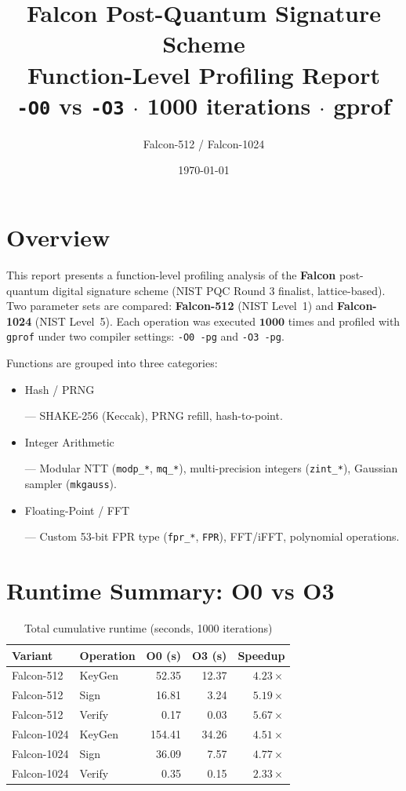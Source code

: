 \documentclass[11pt,a4paper]{article}
\title{\textbf{Falcon Post-Quantum Signature Scheme}\\
        \large Function-Level Profiling Report\\
        \normalsize \texttt{-O0} vs \texttt{-O3} $\cdot$ 1000 iterations $\cdot$ gprof}
\author{Falcon-512 / Falcon-1024}
\date{\today}
\begin{document}
\maketitle
\tableofcontents
\newpage

\section{Overview}

This report presents a function-level profiling analysis of the
\textbf{Falcon} post-quantum digital signature scheme
(NIST PQC Round 3 finalist, lattice-based).
Two parameter sets are compared: \textbf{Falcon-512} (NIST Level~1)
and \textbf{Falcon-1024} (NIST Level~5).
Each operation was executed $\mathbf{1000}$ times and profiled with
\texttt{gprof} under two compiler settings:
\texttt{-O0 -pg} and \texttt{-O3 -pg}.

Functions are grouped into three categories:
\begin{itemize}
  \item \colorbox{hashcolor}{\strut Hash / PRNG} ---
        SHAKE-256 (Keccak), PRNG refill, hash-to-point.
  \item \colorbox{intcolor}{\strut Integer Arithmetic} ---
        Modular NTT (\texttt{modp\_*}, \texttt{mq\_*}),
        multi-precision integers (\texttt{zint\_*}),
        Gaussian sampler (\texttt{mkgauss}).
  \item \colorbox{fpcolor}{\strut Floating-Point / FFT} ---
        Custom 53-bit FPR type (\texttt{fpr\_*}, \texttt{FPR}),
        FFT/iFFT, polynomial operations.
\end{itemize}

\section{Runtime Summary: O0 vs O3}

\begin{table}[h!]
\centering
\caption{Total cumulative runtime (seconds, 1000 iterations)}
\begin{tabular}{llrrr}
\toprule
Variant & Operation & O0 (s) & O3 (s) & Speedup \\
\midrule
  Falcon-512 & KeyGen & 52.35 & 12.37 & $\mathbf{4.23\times}$ \\
  Falcon-512 & Sign & 16.81 & 3.24 & $\mathbf{5.19\times}$ \\
  Falcon-512 & Verify & 0.17 & 0.03 & $\mathbf{5.67\times}$ \\
  Falcon-1024 & KeyGen & 154.41 & 34.26 & $\mathbf{4.51\times}$ \\
  Falcon-1024 & Sign & 36.09 & 7.57 & $\mathbf{4.77\times}$ \\
  Falcon-1024 & Verify & 0.35 & 0.15 & $\mathbf{2.33\times}$ \\
\bottomrule
\end{tabular}
\end{table}
\end{document}
